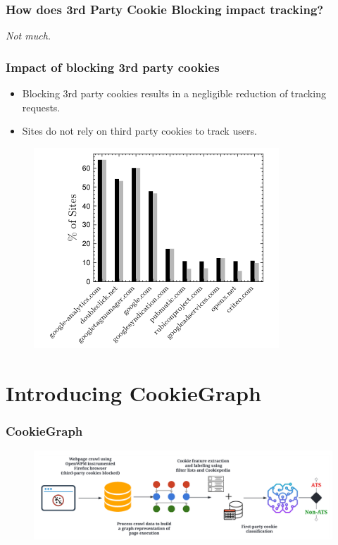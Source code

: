 \documentclass{beamer}
\begin{document}
\begin{frame}
\frametitle{How does 3rd Party Cookie Blocking impact tracking?}
\centering
\textit{Not much.}

\end{frame}

\begin{frame}
\frametitle{Impact of blocking 3rd party cookies}

\begin{itemize}
\item Blocking 3rd party cookies results in a negligible reduction of tracking requests.
\item Sites do not rely on third party cookies to track users.
\end{itemize}

\begin{figure}
\includegraphics[scale=0.5]{img/trackingwhen3rdpcblock}
\end{figure}
\end{frame}



\section{Introducing CookieGraph}

\begin{frame}
\frametitle{CookieGraph}

\begin{figure}
\includegraphics[scale=0.2]{img/diagram}
\end{figure}

\end{frame}
\end{document}
